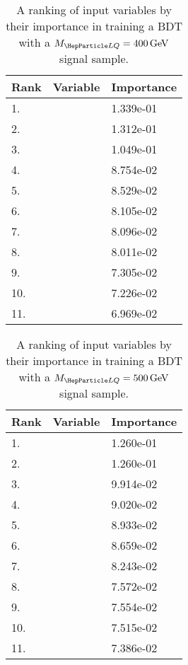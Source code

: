 \begin{table}[H]
	\caption{A ranking of input variables by their importance in training a BDT with a $\MLQ = \SI{400}{GeV}$ signal sample.}
	\begin{center}
		\begin{tabular}{lll} \hline \hline
			Rank & Variable & Importance  \\ \hline
			1. & \MujTwo & 1.339e-01 \\
			2. & \MujOne & 1.312e-01 \\
			3. & \DRof{\PmuOne+\PmuTwo}{\PjOne} & 1.049e-01 \\
			4. & \Muujj & 8.754e-02 \\
			5. & \ptof{\PmuTwo} & 8.529e-02 \\
			6. & \MET & 8.105e-02 \\
			7. & \ST & 8.096e-02 \\
			8. & \ptof{\PjOne} & 8.011e-02 \\
			9. & \ptof{\PjTwo} & 7.305e-02 \\
			10. & \Muu & 7.226e-02 \\
			11. & \ptof{\PmuOne} & 6.969e-02 \\ \hline \hline
		\end{tabular}
		\label{tab:bdtRank400}
	\end{center}
\end{table}

\begin{table}[H]
	\caption{A ranking of input variables by their importance in training a BDT with a $\MLQ = \SI{500}{GeV}$ signal sample.}
	\begin{center}
		\begin{tabular}{lll} \hline \hline
			Rank & Variable & Importance  \\ \hline
			1. & \MujTwo & 1.260e-01 \\
			2. & \MujOne & 1.260e-01 \\
			3. & \ST & 9.914e-02 \\
			4. & \DRof{\PmuOne+\PmuTwo}{\PjOne} & 9.020e-02 \\
			5. & \ptof{\PmuTwo} & 8.933e-02 \\
			6. & \ptof{\PjOne} & 8.659e-02 \\
			7. & \Muujj & 8.243e-02 \\
			8. & \ptof{\PjTwo} & 7.572e-02 \\
			9. & \ptof{\PmuOne} & 7.554e-02 \\
			10. & \MET & 7.515e-02 \\
			11. & \Muu & 7.386e-02 \\ \hline \hline
		\end{tabular}
		\label{tab:bdtRank500}
	\end{center}
\end{table}

